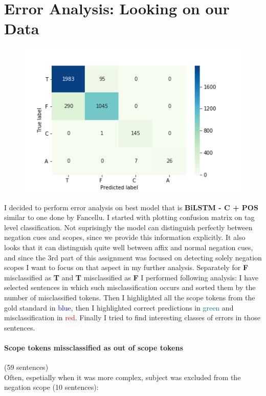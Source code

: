 \documentclass{article}
\begin{document}
\section{Error Analysis: Looking on our Data}
\begin{figure}
    \centering
    \includegraphics[scale=0.6]{../figures/confusion_matrix.png}
\end{figure}
I decided to perform error analysis on best model that is \textbf{BiLSTM - C + POS} similar to one done by Fancellu. I started
with plotting confusion matrix on tag level classification. Not suprisingly the model can distinguish
perfectly between negation cues and scopes, since we provide this information explicitly. It also looks
that it can distinguish quite well between affix and normal negation cues, and since the 3rd part of
this assignment was focused on detecting solely negation scopes I want to focus on that aspect in my further
analysis. Separately for \textbf{F} misclassified as \textbf{T} and \textbf{T} misclassified as \textbf{F}
I performed following analysis: I have selected sentences in which such misclassification occurs and sorted
them by the number of misclassified tokens. Then I highlighted all the scope tokens from the gold standard in \textcolor{blue}{blue}, then I highlighted correct predictions in \textcolor{teal}{green}
and misclassification in \textcolor{red}{red}. Finally I tried to find interesting classes of errors in those sentences.

\paragraph {Scope tokens missclassified as out of scope tokens} (59 sentences)\\
Often, espetially when it was more complex, subject was excluded from the negation scope (10 sentences):
\end{document}
